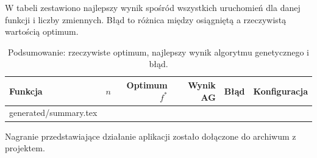 \documentclass[11pt,a4paper]{article}
\makeatletter
\newcommand{\tabinput}[1]{\@@input #1 }
\makeatother
\begin{document}
W tabeli zestawiono najlepszy wynik spośród wszystkich uruchomień dla danej funkcji i liczby
zmiennych. Błąd to różnica między osiągniętą a rzeczywistą wartością optimum.

\begin{table}[H]
\centering
\small
\begin{tabular}{lrrrrl}
\toprule
Funkcja & $n$ & Optimum $f^*$ & Wynik AG & Błąd & Konfiguracja \\
\midrule
\tabinput{generated/summary.tex}
\bottomrule
\end{tabular}
\caption{Podsumowanie: rzeczywiste optimum, najlepszy wynik algorytmu genetycznego i błąd.}
\end{table}

Nagranie przedstawiające działanie aplikacji zostało dołączone
do archiwum z projektem.
\end{document}
